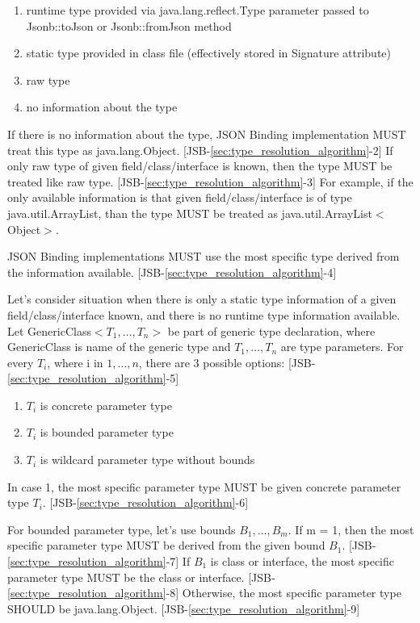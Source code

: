 \begin{enumerate}
	\item runtime type provided via java.lang.reflect.Type parameter passed to Jsonb::toJson or Jsonb::fromJson method
	\item static type provided in class file (effectively stored in Signature attribute)
	\item raw type
	\item no information about the type
\end{enumerate}

If there is no information about the type, JSON Binding implementation MUST treat this type as java.lang.Object. [JSB-\ref{sec:type_resolution_algorithm}-2]
If only raw type of given field/class/interface is known, then the type MUST be treated like raw type. [JSB-\ref{sec:type_resolution_algorithm}-3] For example, if the only available information is that given field/class/interface is of type java.util.ArrayList, than the type MUST be treated as java.util.ArrayList\(<\)Object\(>\).

JSON Binding implementations MUST use the most specific type derived from the information available. [JSB-\ref{sec:type_resolution_algorithm}-4]

Let's consider situation when there is only a static type information of a given field/class/interface known, and there is no runtime type information available. Let GenericClass\(<T_1,\dotsc,T_n>\) be part of generic type declaration, where GenericClass is name of the generic type and \(T_1,\dotsc,T_n\) are type parameters. For every \(T_i\), where i in \(1,\dotsc,n\), there are 3 possible options: [JSB-\ref{sec:type_resolution_algorithm}-5]

\begin{enumerate}
	\item \(T_i\) is concrete parameter type
	\item \(T_i\) is bounded parameter type
	\item \(T_i\) is wildcard parameter type without bounds
\end{enumerate}

In case 1, the most specific parameter type MUST be given concrete parameter type \(T_i\). [JSB-\ref{sec:type_resolution_algorithm}-6]

For bounded parameter type, let's use bounds \(B_1,\dotsc,B_m\). If m = 1, then the most specific parameter type MUST be derived from the given bound \(B_1\). [JSB-\ref{sec:type_resolution_algorithm}-7] If \(B_1\) is class or interface, the most specific parameter type MUST be the class or interface. [JSB-\ref{sec:type_resolution_algorithm}-8] Otherwise, the most specific parameter type SHOULD be java.lang.Object. [JSB-\ref{sec:type_resolution_algorithm}-9]

